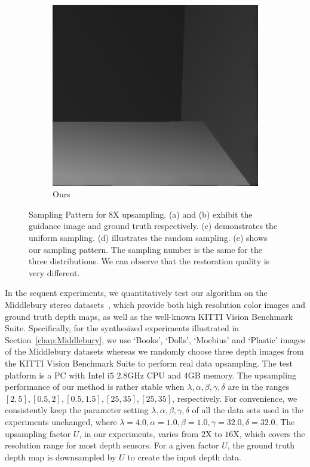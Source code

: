 \documentclass[preprint,10pt,5p,times,twocolumn]{elsarticle}
\begin{document}
\begin{figure}[t]
\begin{subfigure}[t]{0.32\linewidth}
\includegraphics[width=\linewidth]{recon_hybrid.png}
\caption{Ours}
\label{fig:hybrid}
\end{subfigure}
\caption{Sampling Pattern for 8X upsampling. (a) and (b) exhibit the guidance image and ground truth respectively. (c) demonstrates the uniform sampling. (d) illustrates the random sampling. (e) shows our sampling pattern. The sampling number is the same for the three distributions. We can observe that the restoration quality is very different.}
\end{figure}

In the sequent experiments, we quantitatively test our algorithm on the Middlebury stereo datasets~\cite{HS07}, which provide both high resolution color images and ground truth depth maps, as well as the well-known KITTI Vision Benchmark Suite. Specifically, for the synthesized experiments illustrated in Section~\ref{chap:Middlebury}, we use `Books', `Dolls', `Moebius' and `Plastic' images of the Middlebury datasets whereas we randomly choose three depth images from the KITTI Vision Benchmark Suite to perform real data upsampling. The test platform is a PC with Intel i$5$ $2.8$GHz CPU and 4GB memory. The upsampling performance of our method is rather stable when $\lambda,\alpha,\beta,\gamma,\delta$ are in the ranges $[2,5], [0.5, 2], [0.5, 1.5], [25, 35], [25, 35]$, respectively. For convenience, we consistently keep the parameter setting $\lambda,\alpha,\beta,\gamma,\delta$ of all the data sets used in the experiments unchanged, where  $\lambda=4.0,\alpha=1.0,\beta=1.0,\gamma=32.0,\delta=32.0$. The upsampling factor $U$, in our experiments, varies from $2$X to $16$X, which covers the resolution range for most depth sensors. For a given factor $U$, the ground truth depth map is downsampled by $U$ to create the input depth data.
\end{document}
